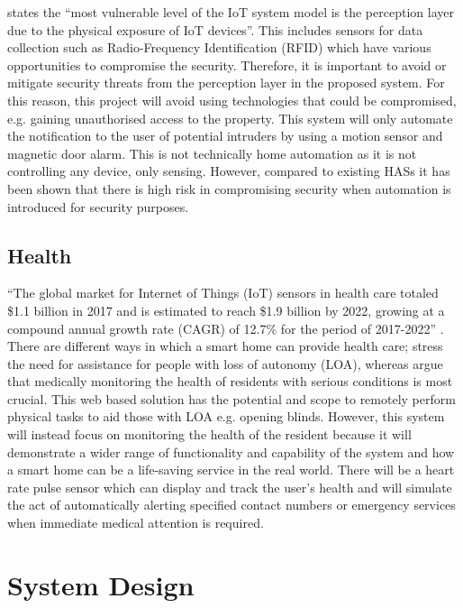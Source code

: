 \documentclass[final]{cmpreport}
\begin{document}
    \cite{evaluateiotsecurity} states the ``most vulnerable level of the IoT system model is the perception layer due to the physical exposure of IoT devices''. This includes sensors for data collection such as Radio-Frequency Identification (RFID) which have various opportunities to compromise the security. Therefore, it is important to avoid or mitigate security threats from the perception layer in the proposed system. For this reason, this project will avoid using technologies that could be compromised, e.g. gaining unauthorised access to the property. This system will only automate the notification to the user of potential intruders by using a motion sensor and magnetic door alarm. This is not technically home automation as it is not controlling any device, only sensing. However, compared to existing HASs it has been shown that there is high risk in compromising security when automation is introduced for security purposes.
    
    \subsection{Health}
    
    ``The global market for Internet of Things (IoT) sensors in health care totaled \$1.1 billion in 2017 and is estimated to reach \$1.9 billion by 2022, growing at a compound annual growth rate (CAGR) of 12.7\% for the period of 2017-2022'' \citep{sensorsinhealthcare}. There are different ways in which a smart home can provide health care; \cite{lossofauto} stress the need for assistance for people with loss of autonomy (LOA), whereas \cite{elderlydisabled} argue that medically monitoring the health of residents with serious conditions is most crucial. This web based solution has the potential and scope to remotely perform physical tasks to aid those with LOA e.g. opening blinds. However, this system will instead focus on monitoring the health of the resident because it will demonstrate a wider range of functionality and capability of the system and how a smart home can be a life-saving service in the real world. There will be a heart rate pulse sensor which can display and track the user's health and will simulate the act of automatically alerting specified contact numbers or emergency services when immediate medical attention is required.   

\section{System Design}\label{design}
\end{document}
